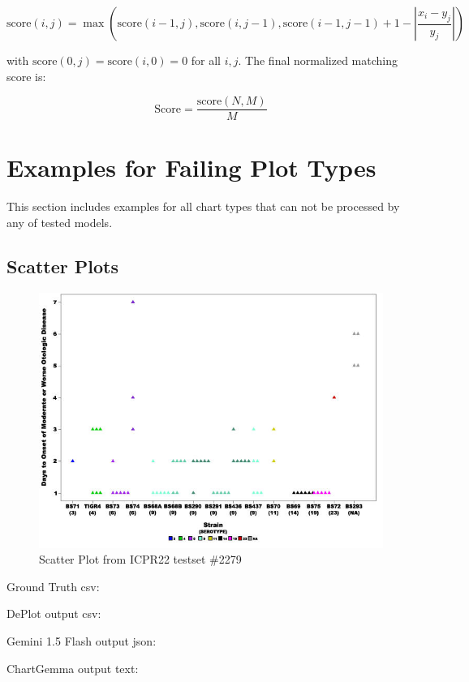 \documentclass[
	letterpaper, %
]{jdf}
\begin{document}
\[
\text{score}(i,j) = \max\left(
\text{score}(i{-}1, j),
\text{score}(i, j{-}1),
\text{score}(i{-}1, j{-}1) + 1 - \left\lvert \frac{x_i - y_j}{y_j} \right\rvert
\right)
\]

with $\text{score}(0, j) = \text{score}(i, 0) = 0$ for all $i, j$. The final normalized matching score is:

\[
\text{Score} = \frac{\text{score}(N, M)}{M}
\]


\section{Examples for Failing Plot Types}\label{app:other-plot-types}
This section includes examples for all chart types that can not be processed by any of tested models.
\subsection{Scatter Plots}\label{par:scatter}
          \begin{figure}
               \includegraphics{test-sample/icpr22/images/scatter/PMC2279396___g002.jpg}
               \caption{Scatter Plot from ICPR22 testset \#2279}
               \label{fig:icpr22-scatter-2279}
                \end{figure}
Ground Truth csv:

DePlot output csv:

Gemini 1.5 Flash output json:

ChartGemma output text:

\end{document}
